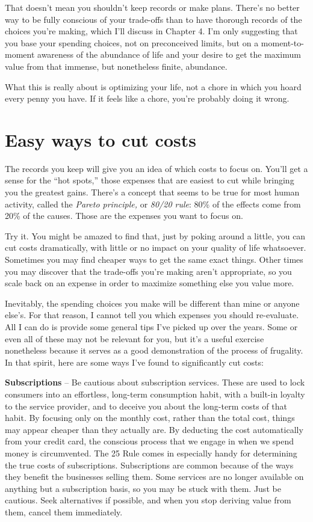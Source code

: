 That doesn't mean you shouldn't keep records or make plans. There's no better way to be fully conscious of your trade-offs than to have thorough records of the choices you're making, which I'll discuss in Chapter 4. I'm only suggesting that you base your spending choices, not on preconceived limits, but on a moment-to-moment awareness of the abundance of life and your desire to get the maximum value from that immense, but nonetheless finite, abundance.

What this is really about is optimizing your life, not a chore in which you hoard every penny you have. If it feels like a chore, you're probably doing it wrong.

\section{Easy ways to cut costs}
The records you keep will give you an idea of which costs to focus on. You'll get a sense for the ``hot spots,'' those expenses that are easiest to cut while bringing you the greatest gains. There's a concept that seems to be true for most human activity, called the \emph{Pareto principle,} or \emph{80/20 rule}: 80\% of the effects come from 20\% of the causes. Those are the expenses you want to focus on.

Try it. You might be amazed to find that, just by poking around a little, you can cut costs dramatically, with little or no impact on your quality of life whatsoever. Sometimes you may find cheaper ways to get the same exact things. Other times you may discover that the trade-offs you're making aren't appropriate, so you scale back on an expense in order to maximize something else you value more.

Inevitably, the spending choices you make will be different than mine or anyone else's. For that reason, I cannot tell you which expenses you should re-evaluate. All I can do is provide some general tips I've picked up over the years. Some or even all of these may not be relevant for you, but it's a useful exercise nonetheless because it serves as a good demonstration of the process of frugality. In that spirit, here are some ways I've found to significantly cut costs:

\textbf{Subscriptions} -- Be cautious about subscription services. These are used to lock consumers into an effortless, long-term consumption habit, with a built-in loyalty to the service provider, and to deceive you about the long-term costs of that habit. By focusing only on the monthly cost, rather than the total cost, things may appear cheaper than they actually are. By deducting the cost automatically from your credit card, the conscious process that we engage in when we spend money is circumvented. The 25 Rule comes in especially handy for determining the true costs of subscriptions. Subscriptions are common because of the ways they benefit the businesses selling them. Some services are no longer available on anything but a subscription basis, so you may be stuck with them. Just be cautious. Seek alternatives if possible, and when you stop deriving value from them, cancel them immediately.

